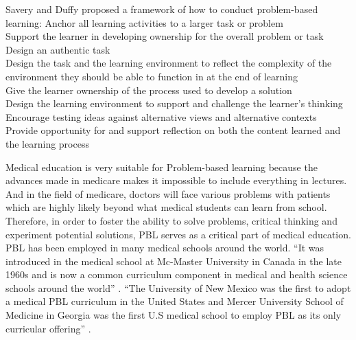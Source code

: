 \documentclass[sigconf]{acmart}
\begin{document}
Savery and Duffy proposed a framework of how to conduct problem-based learning:
Anchor all learning activities to a larger task or problem\\
Support the learner in developing ownership for the overall problem or task\\
Design an authentic task\\
Design the task and the learning environment to reflect the complexity of the environment they should be able to function in at the end of learning\\
Give the learner ownership of the process used to develop a solution\\
Design the learning environment to support and challenge the learner's thinking\\
Encourage testing ideas against alternative views and alternative contexts\\
Provide opportunity for and support reflection on both the content learned and the learning process \cite{Savery2001}

Medical education is very suitable for Problem-based learning because the advances made in medicare makes it impossible to include everything in lectures. And in the field of medicare, doctors will face various problems with patients which are highly likely beyond what medical students can learn from school. Therefore, in order to foster the ability to solve problems, critical thinking and experiment potential solutions, PBL serves as a critical part of medical education. PBL has been employed in many medical schools around the world. ``It was introduced in the medical school at Mc-Master University in Canada in the late 1960s and is now a common curriculum component in medical and health science schools around the world'' \cite{DIMansur2012}. ``The University of New Mexico was the first to adopt a medical PBL curriculum in the United States and Mercer University School of Medicine in Georgia was the first U.S medical school to employ PBL as its only curricular offering'' \cite{Donner1993}.
\end{document}
